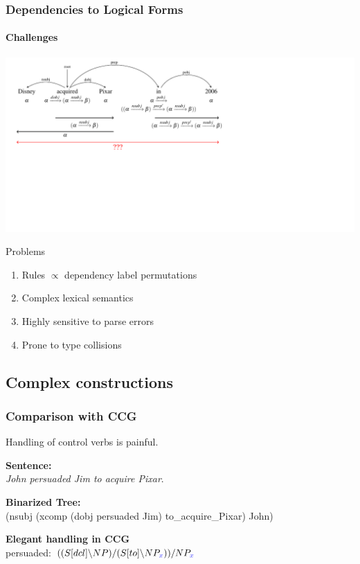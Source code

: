 \documentclass[mathserif,12pt]{beamer}
\newcommand{\hlight}[1]{{\color{blue!80} #1}}
\begin{document}
\begin{frame}[noframenumbering]
\frametitle{Dependencies to Logical Forms}
\framesubtitle{Challenges}
\begin{center}
\vspace{-2.5cm} \includegraphics[trim=1.7em 20.7em 20em 0em,clip=true,scale=1]{figures/pixar_bad_typing_prep_derivation_wrong}
\end{center}

{
\begin{alertblock}{\small Problems}
  \footnotesize
  \begin{enumerate}
   \item Rules $\propto$ dependency label permutations
   \item Complex lexical semantics
   \item Highly sensitive to parse errors
   \item Prone to type collisions
  \end{enumerate}
\end{alertblock}
}
\end{frame}

\subsection{Complex constructions}
\begin{frame}[noframenumbering]
\frametitle{Comparison with CCG}

Handling of control verbs is painful.

\vspace{0.5cm}
\textbf{Sentence:}\\
\textsl{John persuaded Jim to acquire Pixar}.

\vspace{0.3cm}
\textbf{Binarized Tree:}\\
(nsubj (xcomp (dobj persuaded Jim) to\_acquire\_Pixar) John)

\pause
\vspace{0.3cm}
\textbf{Elegant handling in CCG} \\
\hspace{0.5cm} persuaded: $((S[dcl]\backslash NP)/(S[to]\backslash NP_{\hlight{x}}))/NP_{\hlight{x}}$
\end{frame}
\end{document}
